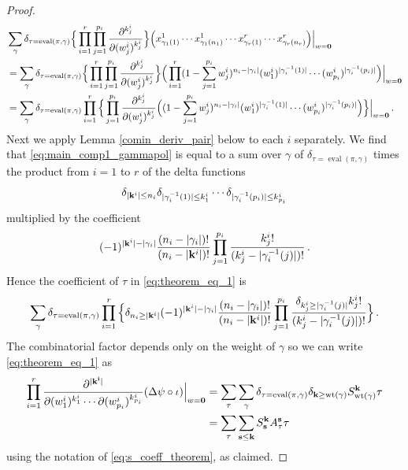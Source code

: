 \documentclass[english,letter paper,12pt,reqno]{article}
\theoremstyle{definition}
\begin{document}
\begin{proof}
\begin{align}
&\sum_{\gamma} \delta_{\tau = \operatorname{eval}(\pi, \gamma)} \Big\{ \prod_{i=1}^r \prod_{j=1}^{p_i} \frac{\partial^{k^i_j}}{\partial (w^i_j)^{k^i_j}} \Big\}\Big( x^1_{\gamma_1(1)} \cdots x^1_{\gamma_1(n_1)} \cdots x^r_{\gamma_r(1)} \cdots x^r_{\gamma_r(n_r)} \Big)\Bigr|_{w = \bold{0}} \nonumber\\
&= \sum_{\gamma} \delta_{\tau = \operatorname{eval}(\pi, \gamma)} \Big\{ \prod_{i=1}^r \prod_{j=1}^{p_i} \frac{\partial^{k^i_j}}{\partial (w^i_j)^{k^i_j}} \Big\}\Big( \prod_{i=1}^r (1-\sum_{j=1}^{p_i} w^i_j)^{n_i-|\gamma_i|} (w_1^i)^{|\gamma^{-1}_i(1)|} \cdots (w_{p_i}^i)^{|\gamma^{-1}_i(p_i)|} \Big)\Bigr|_{w = \bold{0}} \nonumber\\
&= \sum_{\gamma} \delta_{\tau = \operatorname{eval}(\pi, \gamma)} \prod_{i=1}^r \Big\{ \prod_{j=1}^{p_i} \frac{\partial^{k^i_j}}{\partial (w^i_j)^{k^i_j}} \Big( (1-\sum_{j=1}^{p_i} w^i_j)^{n_i-|\gamma_i|} (w_1^i)^{|\gamma^{-1}_i(1)|} \cdots (w_{p_i}^i)^{|\gamma^{-1}_i(p_i)|} \Big) \Big\}  \Bigr|_{w = \bold{0}}\,. \label{eq:main_comp1_gammapol}
\end{align}
Next we apply Lemma \ref{comin_deriv_pair} below to each $i$ separately. We find that \eqref{eq:main_comp1_gammapol} is equal to a sum over $\gamma$ of $\delta_{\tau = \operatorname{eval}(\pi, \gamma)}$ times the product from $i = 1$ to $r$ of the delta functions
\[
\delta_{|\bold{k}^i| \le n_i} \delta_{|\gamma_i^{-1}(1)| \le k^i_1} \cdots \delta_{|\gamma_i^{-1}(p_i)| \le k^i_{p_i}}
\]
multiplied by the coefficient
\[
(-1)^{|\bold{k}^i| - |\gamma_i|} \frac{(n_i - |\gamma_i|)!}{(n_i - |\bold{k}^i|)!} \prod_{j=1}^{p_i} \frac{k^i_j!}{(k^i_j-|\gamma^{-1}_i(j)|)!}\,.
\]
Hence the coefficient of $\tau$ in \eqref{eq:theorem_eq_1} is
\begin{align*}
\sum_{\gamma} \delta_{\tau = \operatorname{eval}(\pi, \gamma)} \prod_{i=1}^r \Big\{ \delta_{n_i \ge |\bold{k}^i|} (-1)^{|\bold{k}^i| - |\gamma_i|} \frac{(n_i-|\gamma_i|)!}{(n_i-|\bold{k}^i|)!} \prod_{j=1}^{p_i} \frac{\delta_{k^i_j \ge |\gamma_i^{-1}(j)|}k^i_j!}{(k^i_j - |\gamma^{-1}_i(j)|)!} \Big\}\,.
\end{align*}
The combinatorial factor depends only on the weight of $\gamma$ so we can write \eqref{eq:theorem_eq_1} as
\begin{align*}
\prod_{i=1}^r \frac{\partial^{|\bold{k^i}|}}{\partial (w^i_1)^{k^i_1} \cdots \partial (w^i_{p_i})^{k^i_{p_i}}} ( \Delta \psi \circ \iota )\Bigr|_{w = \bold{0}} &= \sum_{\tau} \sum_{\gamma} \delta_{\tau = \operatorname{eval}(\pi, \gamma)} \delta_{\bold{k} \ge \operatorname{wt}(\gamma)} S^{\bold{k}}_{\operatorname{wt}(\gamma)} \tau\\
&= \sum_\tau \sum_{\bold{s} \le \bold{k}} S^{\bold{k}}_{\bold{s}} A^{\bold{s}}_\tau \tau
\end{align*}
using the notation of \eqref{eq:s_coeff_theorem}, as claimed.
\end{proof}
\end{document}
